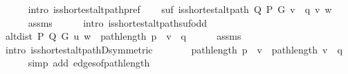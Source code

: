 \begin{isabellebody}
\ \ \ \ \isamarkupfalse%
\ {\isacharparenleft}{\kern0pt}intro\ is{\isacharunderscore}{\kern0pt}shortest{\isacharunderscore}{\kern0pt}alt{\isacharunderscore}{\kern0pt}path{\isacharunderscore}{\kern0pt}pref{\isacharparenright}{\kern0pt}\isanewline
\ \ \isamarkupfalse%
\ suf{\isacharcolon}{\kern0pt}\ {\isachardoublequoteopen}is{\isacharunderscore}{\kern0pt}shortest{\isacharunderscore}{\kern0pt}alt{\isacharunderscore}{\kern0pt}path\ Q\ P\ G\ {\isacharparenleft}{\kern0pt}v\ {\isacharhash}{\kern0pt}\ q{\isacharparenright}{\kern0pt}\ v\ w{\isachardoublequoteclose}\isanewline
\ \ \ \ \isamarkupfalse%
\ assms\isanewline
\ \ \ \ \isamarkupfalse%
\ {\isacharparenleft}{\kern0pt}intro\ is{\isacharunderscore}{\kern0pt}shortest{\isacharunderscore}{\kern0pt}alt{\isacharunderscore}{\kern0pt}path{\isacharunderscore}{\kern0pt}suf{\isacharunderscore}{\kern0pt}odd{\isacharparenright}{\kern0pt}\isanewline
\ \ \isamarkupfalse%
\ {\isachardoublequoteopen}alt{\isacharunderscore}{\kern0pt}dist\ P\ Q\ G\ u\ w\ {\isacharequal}{\kern0pt}\ path{\isacharunderscore}{\kern0pt}length\ {\isacharparenleft}{\kern0pt}p\ {\isacharat}{\kern0pt}\ v\ {\isacharhash}{\kern0pt}\ q{\isacharparenright}{\kern0pt}{\isachardoublequoteclose}\isanewline
\ \ \ \ \isamarkupfalse%
\ assms{\isacharparenleft}{\kern0pt}{}{\isacharparenright}{\kern0pt}\isanewline
\ \ \ \ \isamarkupfalse%
\ {\isacharparenleft}{\kern0pt}intro\ is{\isacharunderscore}{\kern0pt}shortest{\isacharunderscore}{\kern0pt}alt{\isacharunderscore}{\kern0pt}pathD{\isacharparenleft}{\kern0pt}{}{\isacharparenright}{\kern0pt}{\isacharbrackleft}{\kern0pt}symmetric{\isacharbrackright}{\kern0pt}{\isacharparenright}{\kern0pt}\isanewline
\ \ \isamarkupfalse%
\ \isamarkupfalse%
\ {\isachardoublequoteopen}{\isachardot}{\kern0pt}{\isachardot}{\kern0pt}{\isachardot}{\kern0pt}\ {\isacharequal}{\kern0pt}\ path{\isacharunderscore}{\kern0pt}length\ {\isacharparenleft}{\kern0pt}p\ {\isacharat}{\kern0pt}\ {\isacharbrackleft}{\kern0pt}v{\isacharbrackright}{\kern0pt}{\isacharparenright}{\kern0pt}\ {\isacharplus}{\kern0pt}\ path{\isacharunderscore}{\kern0pt}length\ {\isacharparenleft}{\kern0pt}v\ {\isacharhash}{\kern0pt}\ q{\isacharparenright}{\kern0pt}{\isachardoublequoteclose}\isanewline
\ \ \ \ \isamarkupfalse%
\ {\isacharparenleft}{\kern0pt}simp\ add{\isacharcolon}{\kern0pt}\ edges{\isacharunderscore}{\kern0pt}of{\isacharunderscore}{\kern0pt}path{\isacharunderscore}{\kern0pt}length{\isacharparenright}{\kern0pt}\isanewline

\end{isabellebody}
